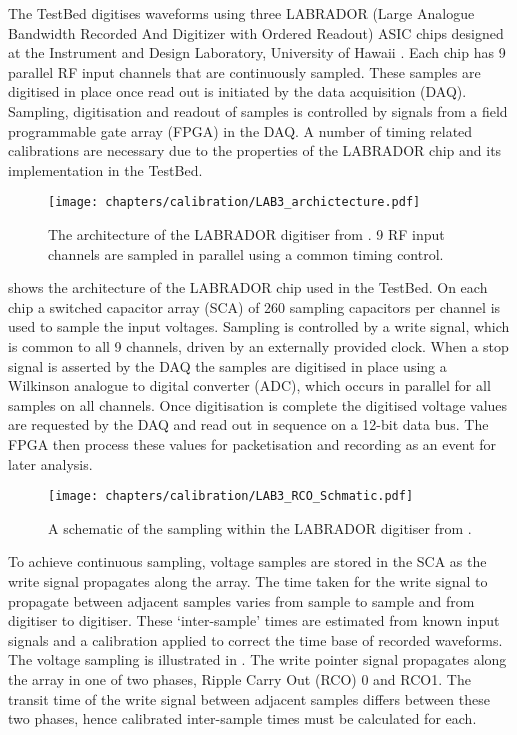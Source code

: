 The TestBed digitises waveforms using three LABRADOR (Large Analogue Bandwidth Recorded And Digitizer with Ordered Readout) ASIC chips designed at the Instrument and Design Laboratory, University of Hawaii \cite{Varner2007447}. Each chip has 9 parallel RF input channels that are continuously sampled. These samples are digitised in place once read out is initiated by the data acquisition (DAQ). Sampling, digitisation and readout of samples is controlled by signals from a field programmable gate array (FPGA) in the DAQ. A number of timing related calibrations are necessary due to the properties of the LABRADOR chip and its implementation in the TestBed. 

\begin{figure}[htpb]
  \texttt{[image: chapters/calibration/LAB3\_archictecture.pdf]}
  \caption{The architecture of the LABRADOR digitiser from \cite{Varner2007447}. 9 RF input channels are sampled in parallel using a common timing control.}
  \label{fig:calibration:LABRADOR-Digitiser-Chip:Architecture}
\end{figure}

 shows the architecture of the LABRADOR chip used in the TestBed. On each chip a switched capacitor array (SCA) of 260 sampling capacitors per channel is used to sample the input voltages. Sampling is controlled by a write signal, which is common to all 9 channels, driven by an externally provided clock. When a stop signal is asserted by the DAQ the samples are digitised in place using a Wilkinson analogue to digital converter (ADC), which occurs in parallel for all samples on all channels. Once digitisation is complete the digitised voltage values are requested by the DAQ and read out in sequence on a 12-bit data bus. The FPGA then process these values for packetisation and recording as an event for later analysis.

\begin{figure}[htpb]
  \texttt{[image: chapters/calibration/LAB3\_RCO\_Schmatic.pdf]}
  \caption{A schematic of the sampling within the LABRADOR digitiser from \cite{Varner2007447}.}
  \label{fig:calibration:LABRADOR-Digitiser-Chip:Schematic}
\end{figure}


To achieve continuous sampling, voltage samples are stored in the SCA as the write signal propagates along the array. The time taken for the write signal to propagate between adjacent samples varies from sample to sample and from digitiser to digitiser. These `inter-sample' times are estimated from known input signals and a calibration applied to correct the time base of recorded waveforms. The voltage sampling is illustrated in . The write pointer signal propagates along the array in one of two phases, Ripple Carry Out (RCO) 0 and RCO1. The transit time of the write signal between adjacent samples differs between these two phases, hence calibrated inter-sample times must be calculated for each.

